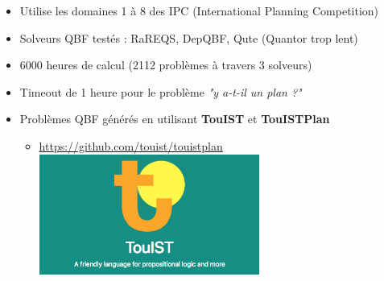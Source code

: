 \documentclass[english,french,usenames,dvipsnames]{beamer}
\begin{document}
\begin{frame}{\subsecname}
\begin{itemize}
\item Utilise les domaines 1 à 8 des IPC (International  Planning Competition)
\item Solveurs QBF testés : RaREQS, DepQBF, Qute (Quantor trop lent)
\item {\color{red}6000 heures} de calcul (2112 problèmes à travers 3 solveurs)
\item Timeout de 1 heure pour le problème \textit{"y a-t-il un plan ?"}
\item Problèmes QBF générés en utilisant \textbf{TouIST} et \textbf{TouISTPlan}
\begin{itemize}
\item \url{https://github.com/touist/touistplan}
\includegraphics[width=0.6\textwidth]{figures/coplas2018/touist.png}
\end{itemize}
\end{itemize}
\end{frame}
\end{document}
